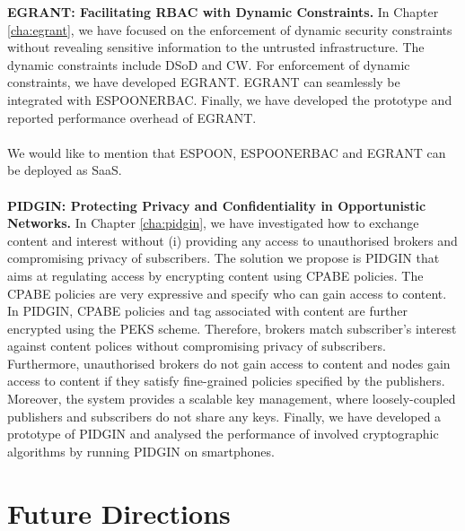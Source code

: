 \documentclass[epsfig,a4paper,11pt,titlepage]{book}
\numberwithin{algorithm}{chapter}
\begin{document}
\noindent \textbf{\gls{EGRANT}: Facilitating \gls{RBAC} with Dynamic Constraints.}
In Chapter \ref{cha:egrant}, we have focused on the enforcement of dynamic security constraints without revealing sensitive information to the untrusted infrastructure. The dynamic constraints include \gls{DSoD} and \gls{CW}. For enforcement of dynamic constraints, we have developed \gls{EGRANT}. \gls{EGRANT} can seamlessly be integrated with \gls{ESPOONERBAC}. Finally, we have developed the prototype and reported performance overhead of \gls{EGRANT}. \\ \\
We would like to mention that \gls{ESPOON}, \gls{ESPOONERBAC} and \gls{EGRANT} can be deployed as \gls{SaaS}. \\ \\
\noindent \textbf{\gls{PIDGIN}: Protecting Privacy and Confidentiality in Opportunistic Networks.}
In Chapter \ref{cha:pidgin}, we have investigated how to exchange content and interest without (i) providing any access to unauthorised brokers and compromising privacy of subscribers. The solution we propose is \gls{PIDGIN} that aims at regulating access by encrypting content using \gls{CPABE} policies. The \gls{CPABE} policies are very expressive and specify who can gain access to content. In \gls{PIDGIN}, \gls{CPABE} policies and tag associated with content are further encrypted using the \gls{PEKS} scheme. Therefore, brokers match subscriber's interest against content polices without compromising privacy of subscribers. Furthermore, unauthorised brokers do not gain access to content and nodes gain access to content if they satisfy fine-grained policies specified by the publishers. Moreover, the system provides a scalable key management, where loosely-coupled publishers and subscribers do not share any keys. Finally, we have developed a prototype of \gls{PIDGIN} and analysed the performance of involved cryptographic algorithms by running \gls{PIDGIN} on smartphones.

\section{Future Directions}
\end{document}
